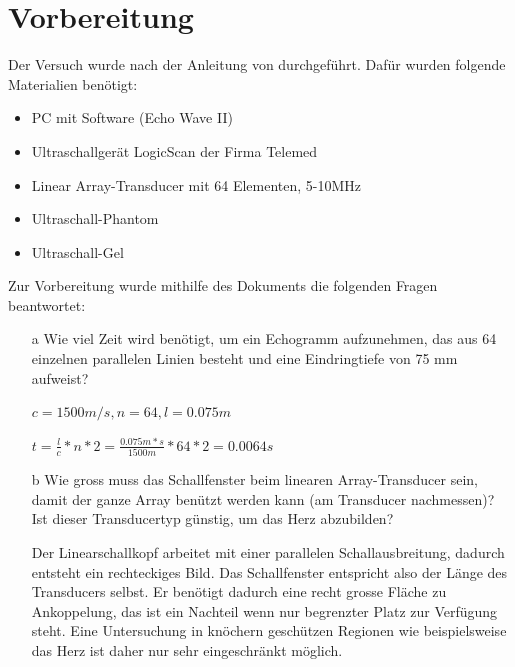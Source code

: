 \documentclass[11pt]{scrartcl}
\begin{document}

    \section{Vorbereitung}
   
    Der Versuch wurde nach der Anleitung von \cite{Echographie} durchgeführt.
    Dafür wurden folgende Materialien benötigt:

    \begin{itemize}
        \item PC mit Software (Echo Wave II)
        \item Ultraschallgerät LogicScan der Firma Telemed
        \item Linear Array-Transducer mit 64 Elementen, 5-10MHz
        \item Ultraschall-Phantom
        \item Ultraschall-Gel
        
    \end{itemize}

    Zur Vorbereitung wurde mithilfe des Dokuments \cite{medUS} die folgenden Fragen beantwortet: %

    \begin{itemize}
        \item[a] Wie viel Zeit wird benötigt, um ein Echogramm aufzunehmen, das aus 64 einzelnen parallelen Linien besteht und eine Eindringtiefe von 75 mm aufweist?
        \item[] $c=1500m/s, n=64, l=0.075m$
        \item[] $t=\frac{l}{c}*n*2=\frac{0.075m*s}{1500m}*64*2=0.0064s$
        \item[b] Wie gross muss das Schallfenster beim linearen Array-Transducer sein, damit der ganze Array benützt werden kann (am Transducer nachmessen)?
                 Ist dieser Transducertyp günstig, um das Herz abzubilden?
        \item[]  Der Linearschallkopf arbeitet mit einer parallelen Schallausbreitung, dadurch entsteht ein rechteckiges Bild.
        Das Schallfenster entspricht also der Länge des Transducers selbst.
        Er benötigt dadurch eine recht grosse Fläche zu Ankoppelung, das ist ein Nachteil wenn nur begrenzter Platz zur Verfügung steht.
        Eine Untersuchung in knöchern geschützen Regionen wie
        beispielsweise das Herz ist daher nur sehr eingeschränkt möglich.
    \end{itemize}
\end{document}
